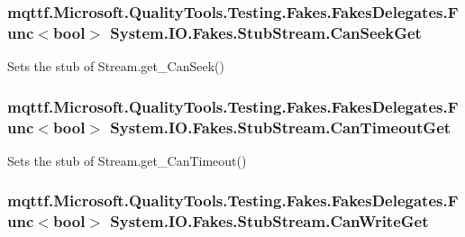 \hypertarget{class_system_1_1_i_o_1_1_fakes_1_1_stub_stream_afdce600c6a1daad84fea4e253ff4fa98}{
\subsubsection[{Can\-Seek\-Get}]{\setlength{\rightskip}{0pt plus 5cm}mqttf.\-Microsoft.\-Quality\-Tools.\-Testing.\-Fakes.\-Fakes\-Delegates.\-Func$<$bool$>$ System.\-I\-O.\-Fakes.\-Stub\-Stream.\-Can\-Seek\-Get}}\label{class_system_1_1_i_o_1_1_fakes_1_1_stub_stream_afdce600c6a1daad84fea4e253ff4fa98}


Sets the stub of Stream.\-get\-\_\-\-Can\-Seek()

\hypertarget{class_system_1_1_i_o_1_1_fakes_1_1_stub_stream_a445376ceb0a1ec2ebc39a35843b6d778}{
\subsubsection[{Can\-Timeout\-Get}]{\setlength{\rightskip}{0pt plus 5cm}mqttf.\-Microsoft.\-Quality\-Tools.\-Testing.\-Fakes.\-Fakes\-Delegates.\-Func$<$bool$>$ System.\-I\-O.\-Fakes.\-Stub\-Stream.\-Can\-Timeout\-Get}}\label{class_system_1_1_i_o_1_1_fakes_1_1_stub_stream_a445376ceb0a1ec2ebc39a35843b6d778}


Sets the stub of Stream.\-get\-\_\-\-Can\-Timeout()

\hypertarget{class_system_1_1_i_o_1_1_fakes_1_1_stub_stream_a4f8bcae7ee2b6c2f1519ddd367c37dcc}{
\subsubsection[{Can\-Write\-Get}]{\setlength{\rightskip}{0pt plus 5cm}mqttf.\-Microsoft.\-Quality\-Tools.\-Testing.\-Fakes.\-Fakes\-Delegates.\-Func$<$bool$>$ System.\-I\-O.\-Fakes.\-Stub\-Stream.\-Can\-Write\-Get}}\label{class_system_1_1_i_o_1_1_fakes_1_1_stub_stream_a4f8bcae7ee2b6c2f1519ddd367c37dcc}


